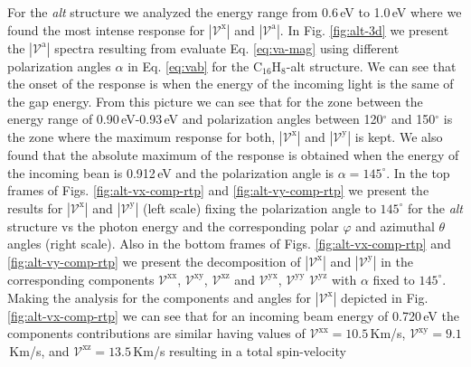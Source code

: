 \documentclass[prb,11pt,tightenlines,twocolumn,aps]{revtex4-1}
\begin{document}
For the \emph{alt} structure we analyzed the energy range from 0.6\,eV to
1.0\,eV where we found the most intense response for 
$|\mathcal{V}^{\mathrm{x}}|$ and $|\mathcal{V}^{\mathrm{a}}|$. In Fig. 
\ref{fig:alt-3d} we present the $|\mathcal{V}^{\mathrm{a}}|$ spectra resulting 
from evaluate Eq. \eqref{eq:va-mag} using different polarization angles $\alpha$
in Eq. \eqref{eq:vab} for the C$_{16}$H$_{8}$-alt structure. We can see that the
onset of the response is when the energy of the incoming light is the same of
the gap energy.
%
From this picture we can see that for the zone between the energy range of
0.90\,eV-0.93\,eV and polarization angles between 120$^{\circ}$ and
150$^{\circ}$ is the zone where the maximum response for both,
$|\mathcal{V}^{\mathrm{x}}|$ and $|\mathcal{V}^{\mathrm{y}}|$ is kept.
We also found that the absolute maximum of the response is obtained when the
energy of the incoming bean is 0.912\,eV and the polarization angle is $\alpha =
145^{\circ}$. 
% 
In the top frames of Figs. \ref{fig:alt-vx-comp-rtp}  and 
%
\ref{fig:alt-vy-comp-rtp} we present the results for
$|\mathcal{V}^{\mathrm{x}}|$ and $|\mathcal{V}^{\mathrm{y}}|$ (left scale)
fixing the polarization angle to $145^{\circ}$ for the \emph{alt} structure vs
the photon energy and the corresponding polar $\varphi$ and azimuthal $\theta$
angles (right scale). Also in the bottom frames of Figs. 
% 
\ref{fig:alt-vx-comp-rtp} and \ref{fig:alt-vy-comp-rtp} we present the
decomposition of $|\mathcal{V}^{\mathrm{x}}|$ and $|\mathcal{V}^{\mathrm{y}}|$
in the corresponding components $\mathcal{V}^{\mathrm{xx}}$,
$\mathcal{V}^{\mathrm{xy}}$, $\mathcal{V}^{\mathrm{xz}}$ and
$\mathcal{V}^{\mathrm{yx}}$, $\mathcal{V}^{\mathrm{yy}}$
$\mathcal{V}^{\mathrm{yz}}$ with $\alpha$ fixed to $145^{\circ}$.
Making the analysis for the components and angles for
$|\mathcal{V}^{\mathrm{x}}|$ depicted in Fig. \ref{fig:alt-vx-comp-rtp} we can
see that for an incoming beam energy of 0.720\,eV the components contributions 
are similar having values of
%
$\mathcal{V}^{\mathrm{xx}}= 10.5$\,Km/s, 
$\mathcal{V}^{\mathrm{xy}}=  9.1$\,Km/s, and
$\mathcal{V}^{\mathrm{xz}}= 13.5$\,Km/s
% 
resulting in a total spin-velocity 
\end{document}
